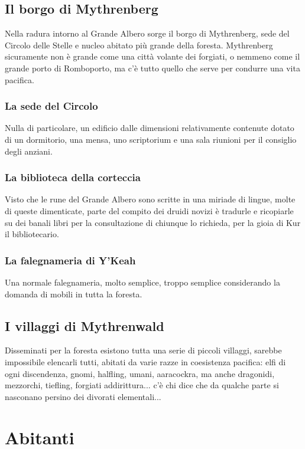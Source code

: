 \subsection{Il borgo di Mythrenberg}

Nella radura intorno al Grande Albero sorge il borgo di Mythrenberg, sede del Circolo delle Stelle e nucleo abitato più grande della foresta. Mythrenberg sicuramente non è grande come una città volante dei forgiati, o nemmeno come il grande porto di Romboporto, ma c'è tutto quello che serve per condurre una vita pacifica.

\subsubsection{La sede del Circolo} Nulla di particolare, un edificio dalle dimensioni relativamente contenute dotato di un dormitorio, una mensa, uno scriptorium e una sala riunioni per il consiglio degli anziani.

\subsubsection{La biblioteca della corteccia} Visto che le rune del Grande Albero sono scritte in una miriade di lingue, molte di queste dimenticate, parte del compito dei druidi novizi è tradurle e ricopiarle su dei banali libri per la consultazione di chiunque lo richieda, per la gioia di Kur il bibliotecario.

\subsubsection{La falegnameria di Y'Keah} Una normale falegnameria, molto semplice, troppo semplice considerando la domanda di mobili in tutta la foresta.

\subsection{I villaggi di Mythrenwald}

Disseminati per la foresta esistono tutta una serie di piccoli villaggi, sarebbe impossibile elencarli tutti, abitati da varie razze in coesistenza pacifica: elfi di ogni discendenza, gnomi, halfling, umani, aaracockra, ma anche dragonidi, mezzorchi, tiefling, forgiati addirittura... c'è chi dice che da qualche parte si nasconano persino dei divorati elementali...

\section{Abitanti}

